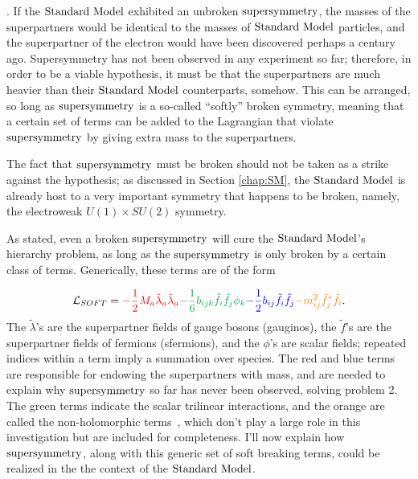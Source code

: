 . If the $\text{Standard\ Model}$ exhibited an unbroken $\text{supersymmetry}$, the masses of the superpartners would be identical to the masses of $\text{Standard\ Model}$ particles, and the superpartner of the electron would have been discovered perhaps a century ago. Supersymmetry has not been observed in any experiment so far; therefore, in order to be a viable hypothesis, it must be that the superpartners are much heavier than their $\text{Standard\ Model}$ counterparts, somehow. This can be arranged, so long as $\text{supersymmetry}$ is a so-called ``softly'' broken symmetry, meaning that a certain set of terms can be added to the Lagrangian that violate $\text{supersymmetry}$ by giving extra mass to the superpartners.

The fact that $\text{supersymmetry}$ must be broken should not be taken as a strike against the hypothesis; as discussed in Section \ref{chap:SM}, the $\text{Standard\ Model}$ is already host to a very important symmetry that happens to be broken, namely, the electroweak $U(1)\times SU(2)$ symmetry.

As stated, even a broken $\text{supersymmetry}$ will cure the $\text{Standard\ Model}$'s hierarchy problem, as long as the $\text{supersymmetry}$ is only broken by a certain class of terms. Generically, these terms are of the form

\begin{equation}
\mathcal{L}_{SOFT}={\color{red}-\frac{1}{2}M_a\tilde{\lambda}_a\tilde{\lambda}_a}
{\color{Green}-\frac{1}{6}b_{ijk}\tilde{f}_i\tilde{f}_{j}\phi_k}
{\color{blue}-\frac{1}{2}b_{ij}\tilde{f}_i\tilde{f}_j}
{\color{orange}-m^2_{ij}\tilde{f}_{j}^*\tilde{f}_i}.
\label{eq:SoftBreak}
\end{equation}
The $\tilde{\lambda}$'s are the superpartner fields of gauge bosons (gauginos), the $\tilde{f}$'s are the superpartner fields of fermions (sfermions), and the $\phi$'s are scalar fields; repeated indices within a term imply a summation over species. The red and blue terms are responsible for endowing the superpartners with mass, and are needed to explain why $\text{supersymmetry}$ so far has never been observed, solving problem 2. The green terms indicate the scalar trilinear interactions, and the orange are called the non-holomorphic terms~\cite{Peskin:1995ev}, which don't play a large role in this investigation but are included for completeness. I'll now explain how $\text{supersymmetry}$, along with this generic set of soft breaking terms, could be realized in the the context of the $\text{Standard\ Model}$.

